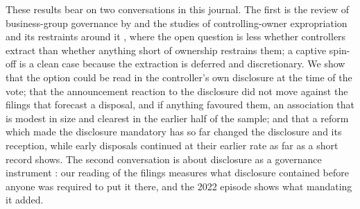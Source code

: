 These results bear on two conversations in this journal. The first is the review of business-group governance by  and the studies of controlling-owner expropriation and its restraints around it \cite{shi2022, bian2023, huang2025, na2025, qian2026}, where the open question is less whether controllers extract than whether anything short of ownership restrains them; a captive spin-off is a clean case because the extraction is deferred and discretionary. We show that the option could be read in the controller's own disclosure at the time of the vote; that the announcement reaction to the disclosure did not move against the filings that forecast a disposal, and if anything favoured them, an association that is modest in size and clearest in the earlier half of the sample; and that a reform which made the disclosure mandatory has so far changed the disclosure and its reception, while early disposals continued at their earlier rate as far as a short record shows. The second conversation is about disclosure as a governance instrument \cite{he2025, karamatzanis2026}: our reading of the filings measures what disclosure contained before anyone was required to put it there, and the 2022 episode shows what mandating it added.


